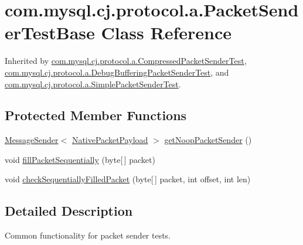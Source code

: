 \hypertarget{classcom_1_1mysql_1_1cj_1_1protocol_1_1a_1_1_packet_sender_test_base}{}\section{com.\+mysql.\+cj.\+protocol.\+a.\+Packet\+Sender\+Test\+Base Class Reference}
\label{classcom_1_1mysql_1_1cj_1_1protocol_1_1a_1_1_packet_sender_test_base}


Inherited by \mbox{\hyperlink{classcom_1_1mysql_1_1cj_1_1protocol_1_1a_1_1_compressed_packet_sender_test}{com.\+mysql.\+cj.\+protocol.\+a.\+Compressed\+Packet\+Sender\+Test}}, \mbox{\hyperlink{classcom_1_1mysql_1_1cj_1_1protocol_1_1a_1_1_debug_buffering_packet_sender_test}{com.\+mysql.\+cj.\+protocol.\+a.\+Debug\+Buffering\+Packet\+Sender\+Test}}, and \mbox{\hyperlink{classcom_1_1mysql_1_1cj_1_1protocol_1_1a_1_1_simple_packet_sender_test}{com.\+mysql.\+cj.\+protocol.\+a.\+Simple\+Packet\+Sender\+Test}}.

\subsection*{Protected Member Functions}
\begin{DoxyCompactItemize}
\item 
\mbox{\hyperlink{interfacecom_1_1mysql_1_1cj_1_1protocol_1_1_message_sender}{Message\+Sender}}$<$ \mbox{\hyperlink{classcom_1_1mysql_1_1cj_1_1protocol_1_1a_1_1_native_packet_payload}{Native\+Packet\+Payload}} $>$ \mbox{\hyperlink{classcom_1_1mysql_1_1cj_1_1protocol_1_1a_1_1_packet_sender_test_base_a0e37ea21e80f4299d9114934ea4ac93e}{get\+Noop\+Packet\+Sender}} ()
\item 
void \mbox{\hyperlink{classcom_1_1mysql_1_1cj_1_1protocol_1_1a_1_1_packet_sender_test_base_a4e7af30941b642cb3eced44a17ec6bdd}{fill\+Packet\+Sequentially}} (byte\mbox{[}$\,$\mbox{]} packet)
\item 
void \mbox{\hyperlink{classcom_1_1mysql_1_1cj_1_1protocol_1_1a_1_1_packet_sender_test_base_adf72fe0033db0785a443b5ca4a4afdad}{check\+Sequentially\+Filled\+Packet}} (byte\mbox{[}$\,$\mbox{]} packet, int offset, int len)
\end{DoxyCompactItemize}


\subsection{Detailed Description}
Common functionality for packet sender tests. 

